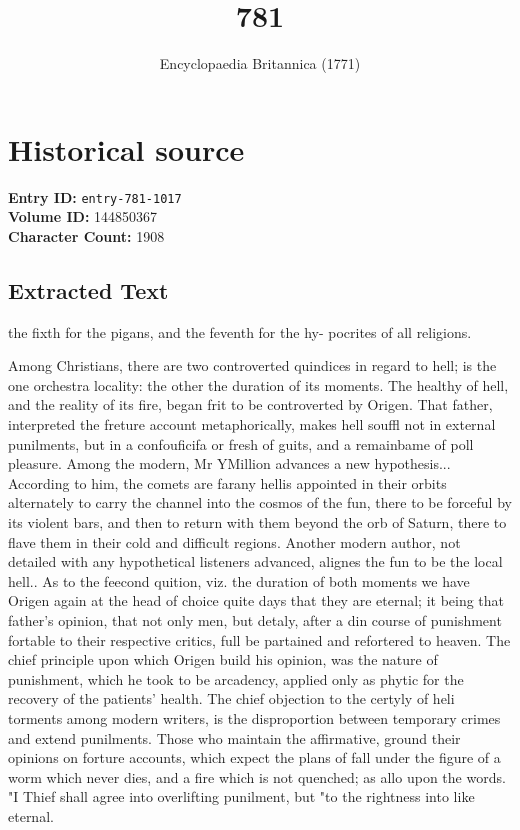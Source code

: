 \documentclass{article}
\title{781}
\date{Encyclopaedia Britannica (1771)}
\begin{document}
\maketitle

\section*{Historical source}
\textbf{Entry ID:} \texttt{entry-781-1017} \\
\textbf{Volume ID:} 144850367 \\
\textbf{Character Count:} 1908

\subsection*{Extracted Text}
the fixth for the pigans, and the feventh for the hy- pocrites of all religions.

Among Christians, there are two controverted quindices in regard to hell; is the one orchestra locality: the other the duration of its moments. The healthy of hell, and the reality of its fire, began frit to be controverted by Origen. That father, interpreted the freture account metaphorically, makes hell souffl not in external punilments, but in a confouficifa or fresh of guits, and a remainbame of poll pleasure. Among the modern, Mr YMillion advances a new hypothesis... According to him, the comets are farany hellis appointed in their orbits alternately to carry the channel into the cosmos of the fun, there to be forceful by its violent bars, and then to return with them beyond the orb of Saturn, there to flave them in their cold and difficult regions. Another modern author, not detailed with any hypothetical listeners advanced, alignes the fun to be the local hell.. As to the feecond quition, viz. the duration of both moments we have Origen again at the head of choice quite days that they are eternal; it being that father’s opinion, that not only men, but detaly, after a din course of punishment fortable to their respective critics, full be partained and refortered to heaven. The chief principle upon which Origen build his opinion, was the nature of punishment, which he took to be arcadency, applied only as phytic for the recovery of the patients' health. The chief objection to the certyly of heli torments among modern writers, is the disproportion between temporary crimes and extend punilments. Those who maintain the affirmative, ground their opinions on forture accounts, which expect the plans of fall under the figure of a worm which never dies, and a fire which is not quenched; as allo upon the words. "I Thief shall agree into overlifting punilment, but "to the rightness into like eternal.
\end{document}
